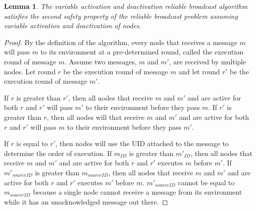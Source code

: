 \documentclass[english]{article}
\newtheorem{lemma}[theorem]{Lemma}
\begin{document}
\begin{lemma}
\label{DeactivationRBSafety2}
The variable activation and deactivation reliable broadcast algorithm satisfies the second safety property of the reliable broadcast problem assuming variable activation and deactivation of nodes.
\end{lemma}
\begin{proof}

By the definition of the algorithm, every node that receives a message $m$ will pass $m$ to its environment at a pre-determined round, called the execution round of message $m$. Assume two messages, $m$ and $m'$, are received by multiple nodes. Let round $r$ be the execution round of message $m$ and let round $r'$ be the execution round of message $m'$.

If $r$ is greater than $r'$, then all nodes that receive $m$ and $m'$ and are active for both $r$ and $r'$ will pass $m'$ to their environment before they pass $m$. If $r'$ is greater than $r$, then all nodes will that receive $m$ and $m'$ and are active for both $r$ and $r'$ will pass $m$ to their environment before they pass $m'$.

If $r$ is equal to $r'$, then nodes will use the UID attached to the message to determine the order of execution. If $m_{ID}$ is greater than $m'_{ID}$, then all nodes that receive $m$ and $m'$ and are active for both $r$ and $r'$ executes $m$ before $m'$. If $m'_{sourceID}$ is greater than $m_{sourceID}$, then all nodes that receive $m$ and $m'$ and are active for both $r$ and $r'$ executes $m'$ before $m$. $m'_{sourceID}$ cannot be equal to $m_{sourceID}$ because a single node cannot receive a message from its environment while it has an unacknowledged message out there.



\end{proof}
\end{document}
